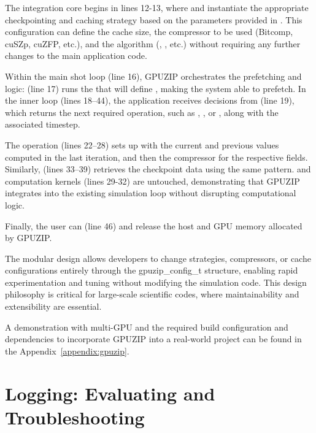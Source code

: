 \documentclass[Ingles]{ic-tese-v3}
\begin{document}
The integration core begins in lines 12-13, where  and  instantiate the appropriate checkpointing and caching strategy based on the parameters provided in . This configuration  can define the cache size, the compressor to be used (Bitcomp, cuSZp, cuZFP, etc.), and the \checkpointing algorithm (\revolve, \zcut, etc.) without requiring any further changes to the main application code.

Within the main shot loop (line 16), GPUZIP orchestrates the prefetching and \checkpointing logic:  (line 17) runs the \psa that will define \pav, making the system able to prefetch. In the inner loop (lines 18–44), the application receives \checkpointing decisions from  (line 19), which returns the next required operation, such as \save, \restore, \fwd or \bwd, along with the associated timestep.

The \save operation (lines 22–28) sets up  with the current and previous values computed in the last iteration, and then the compressor for the respective fields. Similarly, \restore (lines 33–39) retrieves the checkpoint data using the same pattern. \fwd and \bwd computation kernels (lines 29-32) are untouched, demonstrating that GPUZIP integrates into the existing simulation loop without disrupting computational logic.

Finally, the user can  (line 46) and release the host and GPU memory allocated by GPUZIP.

The modular design allows developers to change \checkpointing strategies, compressors, or cache configurations entirely through the gpuzip\_config\_t structure, enabling rapid experimentation and tuning without modifying the simulation code. This design philosophy is critical for large-scale scientific codes, where maintainability and extensibility are essential.

A demonstration with multi-GPU and the required build configuration and dependencies to incorporate GPUZIP into a real-world project can be found in the Appendix~\ref{appendix:gpuzip}.

\section{Logging: Evaluating and Troubleshooting}
\label{sec:osslog}
\end{document}
